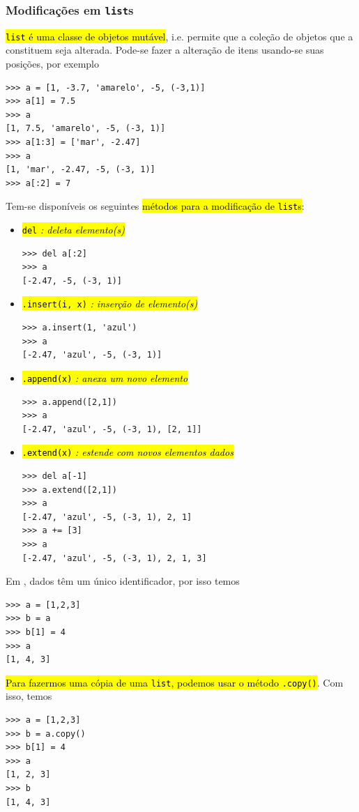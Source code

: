 \subsubsection{Modificações em \lstinline+list+s}

\hl{{\lstinline+list+} é uma classe de objetos mutável}, i.e. permite que a coleção de objetos que a constituem seja alterada. Pode-se fazer a alteração de itens usando-se suas posições, por exemplo
\begin{lstlisting}
>>> a = [1, -3.7, 'amarelo', -5, (-3,1)] 
>>> a[1] = 7.5
>>> a
[1, 7.5, 'amarelo', -5, (-3, 1)]
>>> a[1:3] = ['mar', -2.47]
>>> a
[1, 'mar', -2.47, -5, (-3, 1)]
>>> a[:2] = 7
\end{lstlisting}

Tem-se disponíveis os seguintes \hl{métodos para a modificação de {\lstinline+list+}s}:
\begin{itemize}
\item \hl{{\lstinline+del+} \emph{: deleta elemento(s)}}
\begin{lstlisting}
>>> del a[:2]
>>> a
[-2.47, -5, (-3, 1)]
\end{lstlisting}

\item \hl{{\lstinline+.insert(i, x)+} \emph{: inserção de elemento(s)}}
\begin{lstlisting}
>>> a.insert(1, 'azul')
>>> a
[-2.47, 'azul', -5, (-3, 1)]
\end{lstlisting}

\item \hl{{\lstinline+.append(x)+} \emph{: anexa um novo elemento}}
\begin{lstlisting}
>>> a.append([2,1])
>>> a
[-2.47, 'azul', -5, (-3, 1), [2, 1]]
\end{lstlisting}

\item \hl{{\lstinline+.extend(x)+} \emph{: estende com novos elementos dados}}
\begin{lstlisting}
>>> del a[-1]
>>> a.extend([2,1])
>>> a
[-2.47, 'azul', -5, (-3, 1), 2, 1]
>>> a += [3]
>>> a
[-2.47, 'azul', -5, (-3, 1), 2, 1, 3]
\end{lstlisting}
\end{itemize}

\begin{obs}
  Em {\python}, dados têm um único identificador, por isso temos
\begin{lstlisting}
>>> a = [1,2,3]
>>> b = a
>>> b[1] = 4
>>> a
[1, 4, 3]
\end{lstlisting}
  \hl{Para fazermos uma cópia de uma {\lstinline+list+}, podemos usar o método {\lstinline+.copy()+}}. Com isso, temos
\begin{lstlisting}
>>> a = [1,2,3]
>>> b = a.copy()
>>> b[1] = 4
>>> a
[1, 2, 3]
>>> b
[1, 4, 3]
\end{lstlisting}
\end{obs}

